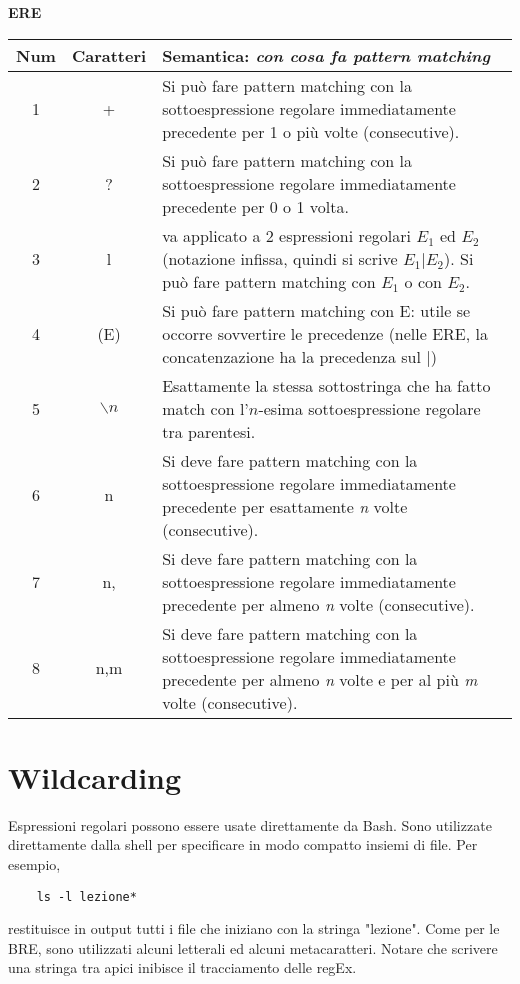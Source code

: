 \begin{center}
	\textbf{ERE} \\
	\begin{tabular}{|c|c|p{10cm}|}
	\hline
        \textbf{Num} & \textbf{Caratteri} & \textbf{Semantica: \textit{con cosa fa pattern matching}} \\ \hline
		1	& +		& Si può fare pattern matching con la sottoespressione regolare immediatamente precedente per 1 o più volte (consecutive). \\ \hline
		2	& ?		& Si può fare pattern matching con la sottoespressione regolare immediatamente precedente per 0 o 1 volta. \\ \hline
		3	& l & va applicato a 2 espressioni regolari $ E_{1} $ ed $ E_{2} $(notazione infissa, quindi si scrive $ E_{1}|E_{2} $). Si può fare pattern matching con $ E_{1} $ o con $ E_{2} $. \\ \hline
		4	& (E)		& Si può fare pattern matching con E: utile se occorre sovvertire le precedenze (nelle ERE, la concatenzazione ha la precedenza sul |) \\ \hline
		5	& $ \backslash n $		& Esattamente la stessa sottostringa che ha fatto match con l'$ n $-esima sottoespressione regolare tra parentesi. \\ \hline
		6	& {n}		& Si deve fare pattern matching con la sottoespressione regolare immediatamente precedente per esattamente \textit{n} volte (consecutive). \\ \hline
		7	& {n,}		& Si deve fare pattern matching con la sottoespressione regolare immediatamente precedente per almeno \textit{n} volte (consecutive). \\ \hline
		8	& {n,m}		& Si deve fare pattern matching con la sottoespressione regolare immediatamente precedente per almeno \textit{n} volte e per al più \textit{m} volte (consecutive). \\ \hline
	\end{tabular}		
\end{center}
\newpage

\section{Wildcarding}
Espressioni regolari possono essere usate direttamente da Bash. Sono utilizzate direttamente dalla shell per specificare in modo compatto insiemi di file. Per esempio,
\begin{lstlisting}
	ls -l lezione*
\end{lstlisting}
restituisce in output tutti i file che iniziano con la stringa "lezione".
Come per le BRE, sono utilizzati alcuni letterali ed alcuni metacaratteri.
Notare che scrivere una stringa tra apici inibisce il tracciamento delle regEx.

